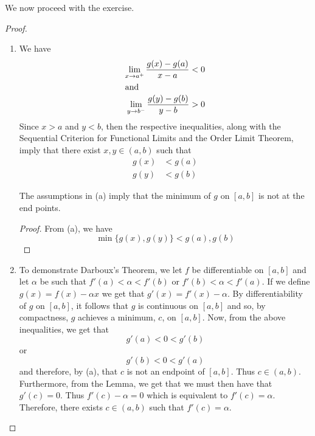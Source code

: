 \begin{enumerate}
    We now proceed with the exercise.
    \begin{proof}
    
    \begin{enumerate}
        \item We have
        \begin{align*}
            \lim_{x \rightarrow a^+} \frac{g(x) - g(a)}{x-a} &< 0 \\
            \intertext{and}
            \lim_{y \rightarrow b^-} \frac{g(y)-g(b)}{y-b} &> 0 
        \end{align*}
        Since \( x > a \) and \( y<b \), then the respective inequalities, along with the Sequential Criterion for Functional Limits and the Order Limit Theorem, imply that there exist \( x,y \in (a,b) \) such that
        \begin{align*}
            g(x) &< g(a) \\
            g(y) &< g(b)
        \end{align*}
        
        \begin{corollary}
        The assumptions in (a) imply that the minimum of \( g \) on \( [a,b] \) is not at the end points.
        \end{corollary}
        
        \begin{proof}
        From (a), we have
        \[
        \min\{ g(x), g(y) \} < g(a), g(b)
        \]
        \end{proof}
        
        \item To demonstrate Darboux's Theorem, we let \( f \) be differentiable on \( [a,b] \) and let \( \alpha \) be such that \( f'(a) < \alpha < f'(b) \) or \( f'(b) < \alpha < f'(a) \). If we define \( g(x) = f(x) - \alpha x \) we get that \( g'(x) = f'(x) - \alpha \). By differentiability of \( g \) on \( [a,b] \), it follows that \( g \) is continuous on \( [a,b] \) and so, by compactness, \( g \) achieves a minimum, \( c \), on \( [a,b] \). Now, from the above inequalities, we get that
        \[
        g'(a) < 0 < g'(b)
        \]
        or
        \[
        g'(b) < 0 < g'(a)
        \]
        and therefore, by (a), that \(c \) is not an endpoint of \( [a,b] \). Thus \( c \in (a,b) \). Furthermore, from the Lemma, we get that we must then have that \( g'(c) = 0 \). Thus \( f'(c) - \alpha = 0 \) which is equivalent to \( f'(c) = \alpha \). Therefore, there exists \( c \in (a,b) \) such that \( f'(c) = \alpha \). 
    \end{enumerate}
    
    \end{proof}
    
    
    
    
    
    
    
    
    
    
\end{enumerate}